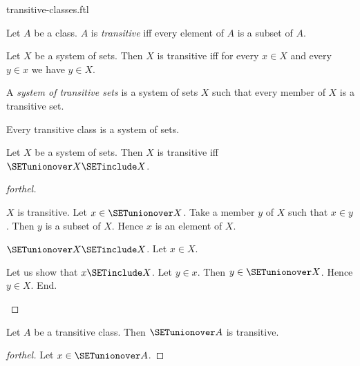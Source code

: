 \documentclass{naproche-library}
\begin{document}
\begin{smodule}[title=Transitive Classes]{transitive-classes.ftl}

\begin{definition}[forthel,id=SET_THEORY_01_8167915266244608]
  Let $A$ be a class.
  $A$ is \emph{transitive} iff every element of $A$ is a subset of $A$.
\end{definition}

\begin{proposition}[forthel,id=SET_THEORY_01_6964770955591680]
  Let $X$ be a system of sets.
  Then $X$ is transitive iff for every $x \in X$ and every $y \in x$ we have $y \in X$.
\end{proposition}


\begin{definition}[forthel,id=SET_THEORY_01_4219967964708864]
  A \emph{system of transitive sets} is a system of sets $X$ such that every member of $X$ is a transitive set.
\end{definition}

\begin{proposition}[forthel,id=SET_THEORY_01_2095807333400576]
  Every transitive class is a system of sets.
\end{proposition}

\begin{proposition}[forthel,id=SET_THEORY_01_6524117649981440]
  Let $X$ be a system of sets.
  Then $X$ is transitive iff $\SETunionover X \SETinclude X$.
\end{proposition}
\begin{proof}[forthel]
  \begin{case}{$X$ is transitive.}
    Let $x \in \SETunionover X$.
    Take a member $y$ of $X$ such that $x \in y$.
    Then $y$ is a subset of $X$.
    Hence $x$ is an element of $X$.
  \end{case}

  \begin{case}{$\SETunionover X \SETinclude X$.}
    Let $x \in X$.

    Let us show that $x \SETinclude X$.
      Let $y \in x$.
      Then $y \in \SETunionover X$.
      Hence $y \in X$.
    End.
  \end{case}
\end{proof}

\begin{proposition}[forthel,id=SET_THEORY_01_620651482185728]
  Let $A$ be a transitive class.
  Then $\SETunionover A$ is transitive.
\end{proposition}
\begin{proof}[forthel]
  Let $x \in \SETunionover A$.


\end{proof}
\end{smodule}
\end{document}
